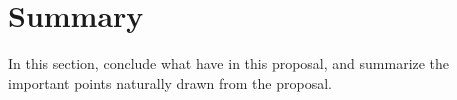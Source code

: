 \chapter{Summary}
In this section, conclude what have in this proposal, and summarize the important
points naturally drawn from the proposal. 